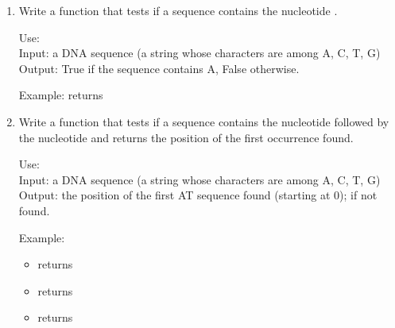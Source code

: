 \documentclass[11pt,class=report,crop=false]{standalone}
\begin{document}
\begin{activite}[DNA]

\begin{enumerate}
  \item Write a  function that tests if a sequence contains the nucleotide .
  
  \begin{fonction}[\ci{presence_of_A()}]
  Use:  \\
  Input: a DNA sequence (a string whose characters are among A, C, T, G) \\
  Output: \og{}True\fg{} if the sequence contains \og{}A\fg{}, \og{}False\fg{} otherwise.
  
  \medskip
    
  Example:  returns 
  \end{fonction}
  

   
  \item Write a  function that tests if a sequence contains the nucleotide  followed by the nucleotide  and returns the position of the first occurrence found.
  
  \begin{fonction}[\ci{position_of_AT()}]
  Use:  \\
  Input: a DNA sequence (a string whose characters are among A, C, T, G) \\
  Output: the position of the first \og{}AT\fg{} sequence found (starting at 0);  if not found.
  
  \medskip
    
  Example: 
  \begin{itemize}  
    \item {} returns 
    \item {} returns 
    \item {} returns 
  \end{itemize} 
  \end{fonction}
  

\end{enumerate}
\end{activite}
\end{document}

